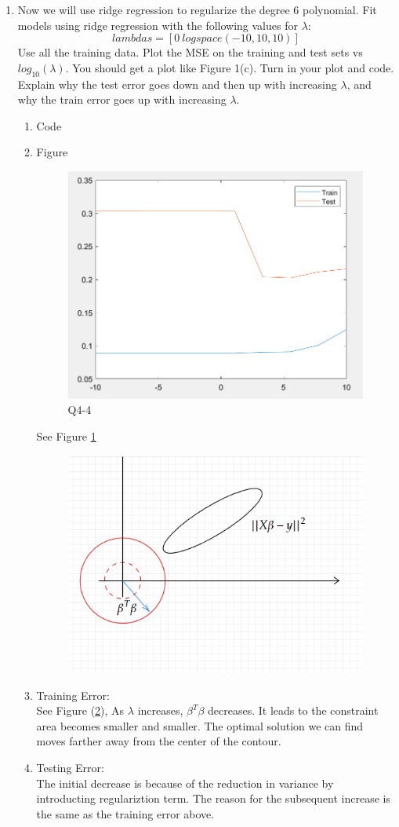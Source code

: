 \documentclass[11pt]{article}
\newcommand{\mfile}[1]  {{\small }} %
\begin{document}
\begin{enumerate}
\item Now we will use ridge regression to regularize the degree 6 polynomial. Fit models using ridge regression with
the following values for $\lambda$:
$$lambdas=[0 \  logspace(-10,10,10)]$$
Use all the training data. Plot the MSE on the training and test sets vs $log_{10}(\lambda)$. You should get a plot like
Figure 1(c). Turn in your plot and code. Explain why the test error goes down and then up with increasing $\lambda$,
and why the train error goes up with increasing $\lambda$.
	\begin{enumerate}
		\item Code \mfile{q4_4.m}
		\item Figure
		\begin{figure}[h!]
			\centering
			\includegraphics[width=0.5\linewidth]{Q44.png}
			\caption{Q4-4}
			\label{fig:Q4_4}
		\end{figure}
		See Figure \ref{fig:Q4_4}
		
		\begin{figure}[h!]
			\centering
			\includegraphics[width=0.8\linewidth]{q441.png}
			\caption{}
			\label{fig:Q4_4_1}
		\end{figure}
		\item Training Error:\\
		See Figure (\ref{fig:Q4_4_1}),
		As $\lambda$ increases, $\beta^T\beta$ decreases. 
		It leads to the constraint area becomes smaller and smaller. 
		The optimal solution we can find moves farther away from the center of the contour. 
		\item Testing Error: \\
		The initial decrease is because of the reduction in variance by introducting regulariztion term. 
		The reason for the subsequent increase is the same as the training error above.
		

\end{enumerate}
\end{enumerate}
\end{document}
